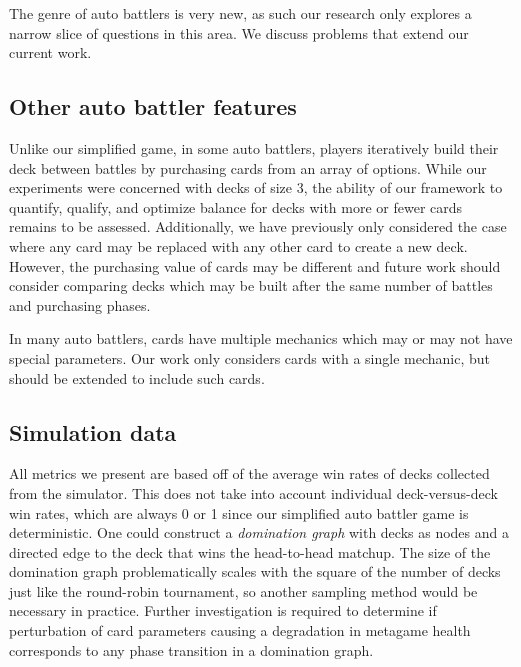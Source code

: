 
The genre of auto battlers is very new, as such our research only explores a narrow slice of questions in this area. We discuss problems that extend our current work.

\subsection{Other auto battler features}


Unlike our simplified game, in some auto battlers,
players iteratively build their deck between battles by purchasing
cards from an array of options. While our experiments were concerned with decks of size 3, 
the ability of our framework to quantify, qualify, and optimize balance for decks with 
more or fewer cards remains to be assessed. Additionally, we have previously only considered
the case where any card may be replaced with any other card to create a new deck. However, 
the purchasing value of cards may be different and future work should consider comparing decks
which may be built after the same number of battles and purchasing phases.


In many auto battlers, cards have multiple mechanics which may or may not have special parameters.
Our work only considers cards with a single mechanic, but should be extended to include such cards.


\subsection{Simulation data}

All metrics we present are based off of the average win rates of decks collected from the simulator. 
This does not take into account individual deck-versus-deck win rates, which are always 0 or 1 since
our simplified auto battler game is deterministic. One could construct a \textit{domination graph} with decks
as nodes and a directed edge to the deck that wins the head-to-head matchup. The size of the domination
graph problematically scales with the square of the number of decks just like the round-robin tournament,
so another sampling method would be necessary in practice. Further investigation is required to determine if perturbation of card parameters causing a degradation
in metagame health corresponds to any phase transition in a domination graph.

